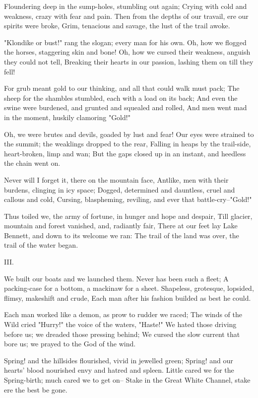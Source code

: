 \begin{poemblock}
 Floundering deep in the sump-holes, stumbling out again;
 Crying with cold and weakness, crazy with fear and pain.
 Then from the depths of our travail, ere our spirits were broke,
 Grim, tenacious and savage, the lust of the trail awoke.

 "Klondike or bust!" rang the slogan; every man for his own.
 Oh, how we flogged the horses, staggering skin and bone!
 Oh, how we cursed their weakness, anguish they could not tell,
 Breaking their hearts in our passion, lashing them on till they fell!

 For grub meant gold to our thinking, and all that could walk must pack;
 The sheep for the shambles stumbled, each with a load on its back;
 And even the swine were burdened, and grunted and squealed and rolled,
 And men went mad in the moment, huskily clamoring "Gold!"

 Oh, we were brutes and devils, goaded by lust and fear!
 Our eyes were strained to the summit; the weaklings dropped to the rear,
 Falling in heaps by the trail-side, heart-broken, limp and wan;
 But the gaps closed up in an instant, and heedless the chain went on.

 Never will I forget it, there on the mountain face,
 Antlike, men with their burdens, clinging in icy space;
 Dogged, determined and dauntless, cruel and callous and cold,
 Cursing, blaspheming, reviling, and ever that battle-cry--"Gold!"

 Thus toiled we, the army of fortune, in hunger and hope and despair,
 Till glacier, mountain and forest vanished, and, radiantly fair,
 There at our feet lay Lake Bennett, and down to its welcome we ran:
 The trail of the land was over, the trail of the water began.


 III.

 We built our boats and we launched them.  Never has been such a fleet;
 A packing-case for a bottom, a mackinaw for a sheet.
 Shapeless, grotesque, lopsided, flimsy, makeshift and crude,
 Each man after his fashion builded as best he could.

 Each man worked like a demon, as prow to rudder we raced;
 The winds of the Wild cried "Hurry!" the voice of the waters, "Haste!"
 We hated those driving before us; we dreaded those pressing behind;
 We cursed the slow current that bore us; we prayed to the God of the wind.

 Spring! and the hillsides flourished, vivid in jewelled green;
 Spring! and our hearts' blood nourished envy and hatred and spleen.
 Little cared we for the Spring-birth; much cared we to get on--
 Stake in the Great White Channel, stake ere the best be gone.


\end{poemblock}
